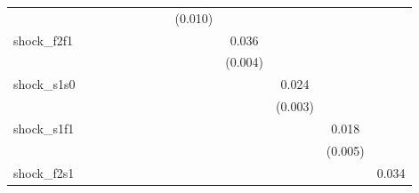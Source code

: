 {\begin{tabular}{l*{12}{c}}
            &                     &                     &                     &                     &                     &                     &                     &     (0.010)         &                     &                     &                     &                     \\
\addlinespace
shock\_f2f1  &                     &                     &                     &                     &                     &                     &                     &                     &       0.036\sym{***}&                     &                     &                     \\
            &                     &                     &                     &                     &                     &                     &                     &                     &     (0.004)         &                     &                     &                     \\
\addlinespace
shock\_s1s0  &                     &                     &                     &                     &                     &                     &                     &                     &                     &       0.024\sym{***}&                     &                     \\
            &                     &                     &                     &                     &                     &                     &                     &                     &                     &     (0.003)         &                     &                     \\
\addlinespace
shock\_s1f1  &                     &                     &                     &                     &                     &                     &                     &                     &                     &                     &       0.018\sym{***}&                     \\
            &                     &                     &                     &                     &                     &                     &                     &                     &                     &                     &     (0.005)         &                     \\
\addlinespace
shock\_f2s1  &                     &                     &                     &                     &                     &                     &                     &                     &                     &                     &                     &       0.034\sym{***}\\

\end{tabular}}
